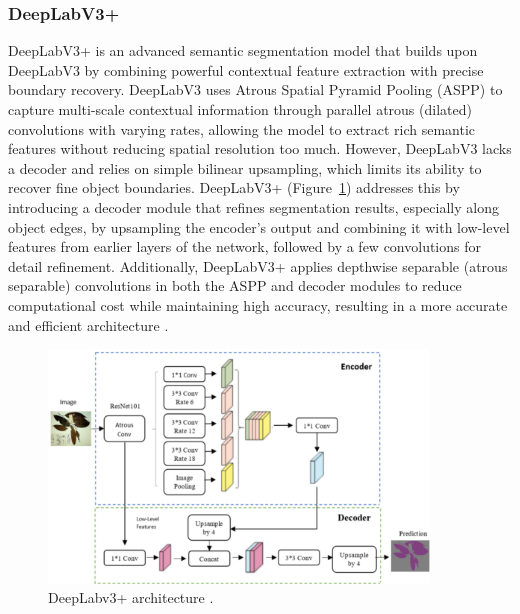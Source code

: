 \subsubsection{DeepLabV3+}
DeepLabV3+ is an advanced semantic segmentation model that builds upon DeepLabV3 by combining powerful contextual feature extraction with precise boundary recovery. DeepLabV3 uses Atrous Spatial Pyramid Pooling (ASPP) to capture multi-scale contextual information through parallel atrous (dilated) convolutions with varying rates, allowing the model to extract rich semantic features without reducing spatial resolution too much. However, DeepLabV3 lacks a decoder and relies on simple bilinear upsampling, which limits its ability to recover fine object boundaries. DeepLabV3+ (Figure~\ref{fig:DeepLabv3+}) addresses this by introducing a decoder module that refines segmentation results, especially along object edges, by upsampling the encoder’s output and combining it with low-level features from earlier layers of the network, followed by a few convolutions for detail refinement. Additionally, DeepLabV3+ applies depthwise separable (atrous separable) convolutions in both the ASPP and decoder modules to reduce computational cost while maintaining high accuracy, resulting in a more accurate and efficient architecture \parencite{chen2018encoder}.
\begin{figure}[H] %
    \centering
    \includegraphics[width=0.9\textwidth]{chapters/chapter1/images/Figure22.png}
    \caption{DeepLabv3+ architecture \parencite{hussein2020semantic}.}
    \label{fig:DeepLabv3+}
\end{figure}


